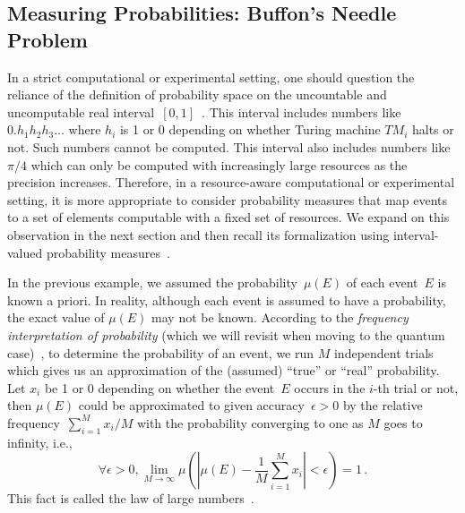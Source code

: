 \documentclass[12pt]{iopart}
\theoremstyle{plain}
\theoremstyle{definition}
\theoremstyle{remark}
\newcommand{\pmeas}{\ensuremath{\mu}}
\begin{document}
\subsection{Measuring Probabilities: Buffon's Needle Problem\label{subsec:Measuring-Probabilities:-Buffon}}

In a strict computational or experimental setting, one should question
the reliance of the definition of probability space on the uncountable
and uncomputable real
interval~$[0,1]$~\cite{Turing_1937,Ziegler2007,weihrauch2012computable}.
This interval includes numbers like $0.h_{1}h_{2}h_{3}\ldots$ where
$h_{i}$ is 1 or 0 depending on whether Turing machine
$\mathit{TM}_{i}$ halts or not. Such numbers cannot be computed. This
interval also includes numbers like $\pi / 4$ which can only be
computed with increasingly large resources as the precision
increases. Therefore, in a resource-aware computational or
experimental setting, it is more appropriate to consider probability
measures that map events to a set of elements computable with a fixed
set of resources. We expand on this observation in the next section
and then recall its formalization using interval-valued probability
measures~\cite{Weichselberger2000,JamisonLodwick2004}.
 
In the previous example, we assumed the probability~$\pmeas(E)$ of
each event~$E$ is known a priori. In reality, although each event is
assumed to have a probability, the exact value of $\pmeas(E)$ may not
be known. According to the \emph{frequency interpretation of
  probability} (which we will revisit when moving to the quantum
case)~\cite{Venn1876,Hajek2012}, 
to determine the probability of an event, we run $M$
independent trials which gives us an approximation of the (assumed)
``true'' or ``real'' probability. Let $x_{i}$ be 1 or 0 depending on
whether the event~$E$ occurs in the $i$-th trial or not, then
$\pmeas(E)$ could be approximated to given accuracy~$\epsilon>0$ by
the relative frequency~$\sum_{i=1}^{M}x_{i} / M$ with the
probability converging to one as $M$ goes to infinity, i.e.,
\begin{equation}
\forall\epsilon>0,\lim_{M\rightarrow\infty}\pmeas\left(\left|\pmeas(E)-\frac{1}{M}\sum_{i=1}^{M} x_{i}\right|<\epsilon\right)=1\,.
\end{equation}
This fact is called the law of large numbers~\cite{Bernoulli2006,Kolmogorov1950,Uspensky1937,Shafer1976,544199}.
\end{document}
